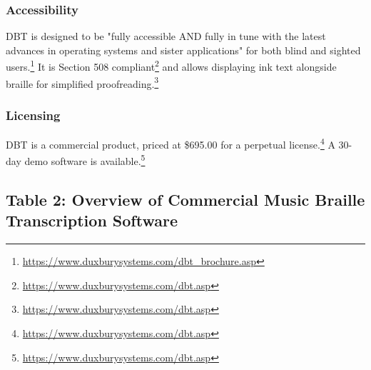 \subsubsection{Accessibility}
DBT is designed to be "fully accessible AND fully in tune with the latest advances in operating systems and sister applications" for both blind and sighted users.\footnote{\url{https://www.duxburysystems.com/dbt_brochure.asp}} It is Section 508 compliant\footnote{\url{https://www.duxburysystems.com/dbt.asp}} and allows displaying ink text alongside braille for simplified proofreading.\footnote{\url{https://www.duxburysystems.com/dbt.asp}}

\subsubsection{Licensing}
DBT is a commercial product, priced at \$695.00 for a perpetual license.\footnote{\url{https://www.duxburysystems.com/dbt.asp}} A 30-day demo software is available.\footnote{\url{https://www.duxburysystems.com/dbt.asp}}

\subsection{Table 2: Overview of Commercial Music Braille Transcription Software}

